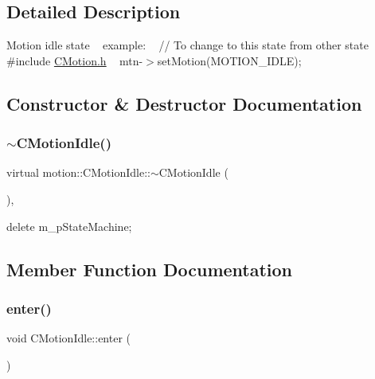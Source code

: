 \subsection{Detailed Description}
Motion idle state ~\newline
 example\+: ~\newline
// To change to this state from other state ~\newline
 \#include \mbox{\hyperlink{CMotion_8h}{C\+Motion.\+h}} ~\newline
 mtn-\/$>$set\+Motion(\+M\+O\+T\+I\+O\+N\+\_\+\+I\+D\+L\+E); ~\newline


\subsection{Constructor \& Destructor Documentation}
\mbox{\label{classmotion_1_1CMotionIdle_a45b57a25a1b53c585fc2ef648dc1ec4a}} 
\subsubsection{\texorpdfstring{$\sim$\+C\+Motion\+Idle()}{~CMotionIdle()}}
{\footnotesize\ttfamily virtual motion\+::\+C\+Motion\+Idle\+::$\sim$\+C\+Motion\+Idle (\begin{DoxyParamCaption}\item[{void}]{ }\end{DoxyParamCaption})\hspace{0.3cm}{\ttfamily [inline]}, {\ttfamily [virtual]}}

delete m\+\_\+p\+State\+Machine; 

\subsection{Member Function Documentation}
\mbox{\label{classmotion_1_1CMotionIdle_adf54cf3d93e54060a3060017e55ea706}} 
\subsubsection{\texorpdfstring{enter()}{enter()}}
{\footnotesize\ttfamily void C\+Motion\+Idle\+::enter (\begin{DoxyParamCaption}\item[{\mbox{\hyperlink{classmotion_1_1CMotion}{C\+Motion}} $\ast$}]{ }\end{DoxyParamCaption})\hspace{0.3cm}{\ttfamily [virtual]}}

